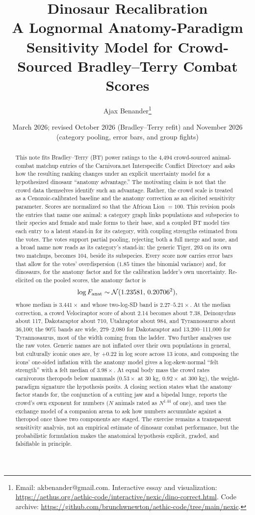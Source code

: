 \documentclass[11pt]{article}
\title{\textbf{Dinosaur Recalibration}\\[5pt]
\large A Lognormal Anatomy-Paradigm Sensitivity Model for Crowd-Sourced Bradley--Terry Combat Scores}
\author{Ajax Benander\thanks{Email: akbenander@gmail.com. Interactive essay and visualization: \url{https://aethus.org/aethic-code/interactive/nexic/dino-correct.html}. Code archive: \url{https://github.com/brunchwnewton/aethic-code/tree/main/nexic}.}}
\date{March 2026; revised October 2026 (Bradley--Terry refit) and November 2026 (category pooling, error bars, and group fights)}
\begin{document}
\maketitle

\begin{abstract}
This note fits Bradley--Terry (BT) power ratings to the 4,494 crowd-sourced animal-combat matchup entries of the Carnivora.net Interspecific Conflict Directory and asks how the resulting ranking changes under an explicit uncertainty model for a hypothesized dinosaur ``anatomy advantage.'' The motivating claim is not that the crowd data themselves identify such an advantage. Rather, the crowd scale is treated as a Cenozoic-calibrated baseline and the anatomy correction as an elicited sensitivity parameter. Scores are normalized so that the African Lion $=100$. This revision pools the entries that name one animal: a category graph links populations and subspecies to their species and female and male forms to their base, and a coupled BT model ties each entry to a latent stand-in for its category, with coupling strengths estimated from the votes. The votes support partial pooling, rejecting both a full merge and none, and a broad name now reads as its category's stand-in: the generic Tiger, 293 on its own two matchups, becomes 104, beside its subspecies. Every score now carries error bars that allow for the votes' overdispersion ($1.85$ times the binomial variance) and, for dinosaurs, for the anatomy factor and for the calibration ladder's own uncertainty. Re-elicited on the pooled scores, the anatomy factor is
\[
\log F_{\rm anat}\sim\mathcal N(1.23581,\,0.20706^2),
\]
whose median is $3.441\times$ and whose two-log-SD band is $2.27$--$5.21\times$. At the median correction, a crowd Velociraptor score of about 2.14 becomes about 7.38, Deinonychus about 117, Dakotaraptor about 710, Utahraptor about 984, and Tyrannosaurus about 36,100; the 90\% bands are wide, 279--2,080 for Dakotaraptor and 13,200--111,000 for Tyrannosaurus, most of the width coming from the ladder. Two further analyses use the raw votes. Generic names are not inflated over their own populations in general, but culturally iconic ones are, by $+0.22$ in log score across 13 icons, and composing the icons' one-sided inflation with the anatomy model gives a log-skew-normal ``felt strength'' with a felt median of $3.98\times$. At equal body mass the crowd rates carnivorous theropods below mammals ($0.53\times$ at 30 kg, $0.92\times$ at 300 kg), the weight-paradigm signature the hypothesis posits. A closing section states what the anatomy factor stands for, the conjunction of a cutting jaw and a bipedal lunge, reports the crowd's own exponent for numbers ($N$ animals rated as $N^{1.44}$ of one), and uses the exchange model of a companion arena to ask how numbers accumulate against a theropod once those two components are staged. The exercise remains a transparent sensitivity analysis, not an empirical estimate of dinosaur combat performance, but the probabilistic formulation makes the anatomical hypothesis explicit, graded, and falsifiable in principle.
\end{abstract}
\end{document}

